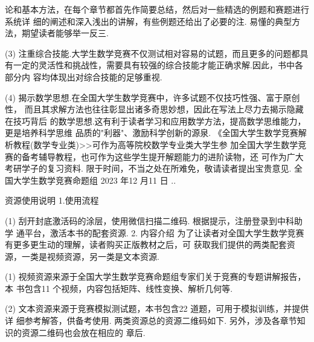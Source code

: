 
\hypertarget{source-p006}{}
论和基本方法，在每个章节都首先作简要总结，然后对一些精选的例题和赛题进行系统详
细的阐述和深入浅出的讲解，有些例题还给出了必要的注.
易懂的典型方法，期望读者能够举一反三.
\par\noindent (3) 注重综合技能.大学生数学竞赛不仅测试相对容易的试题，而且更多的问题都具
有一定的灵活性和挑战性，需要具有较强的综合技能才能正确求解.因此，书中各部分内
容均体现出对综合技能的足够重视.
\par\noindent (4) 揭示数学思想.在全国大学生数学竞赛中，许多试题不仅技巧性强、富于原创性，
而且其求解方法也往往彰显出诸多奇思妙想，因此在写法上尽力去揭示隐藏在技巧背后
的数学思想.这有利于读者学习和应用数学方法，提高数学思维能力，更是培养科学思维
品质的"利器"、激励科学创新的源泉.
《全国大学生数学竞赛解析教程(数学专业类)>>可作为高等院校数学专业类大学生参
加全国大学生数学竞赛的备考辅导教程，也可作为这些学生提开解题能力的进阶读物，还
可作为广大考研学子的复习资料.
限于时间，不当之处在所难免，敬请读者提出宝贵意见.
全国大学生数学竞赛命题组
2023 年12 月11 日
..



\hypertarget{source-p007}{}
资源使用说明
1.使用流程
\par\noindent (1) 刮开封底激活码的涂层，使用微信扫描二维码. 根据提示，注册登录到中科助学
通平台，激活本书的配套资源.
2. 内容介绍
为了让读者对全国大学生数学竞赛有更多更生动的理解，读者购买正版教材之后，可
获取我们提供的两类配套资源，一类是视频资源，另一类是文本资源.
\par\noindent (1) 视频资源来源于全国大学生数学竞赛命题组专家们关于竞赛的专题讲解报告，本
书包含11 个视频，内容包括矩阵、线性变换、解析几何等.
\par\noindent (2) 文本资源来源于竞赛模拟测试题，本书包含22 道题，可用于模拟训练，并提供详
细参考解答，供备考使用.
两类资源总的资源二维码如下. 另外，涉及各章节知识的资源二维码也会放在相应的
章后.
